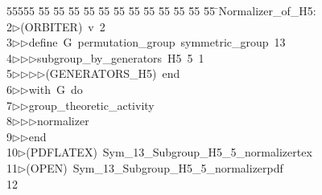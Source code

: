 %
%
\begin{tabbing}
55555 \= 55 \= 55 \= 55 \= 55 \= 55 \= 55 \= 55 \= 55 \= 55 \= 55 \= 55 \= 55 \= \>Normalizer\_of\_H5:\\[0pt]
2\>$\triangleright$\>(ORBITER)\ v\ 2\ \\[0pt]
3\>$\triangleright$\>$\triangleright$\>define\ G\ permutation\_group\ symmetric\_group\ 13\ \\[0pt]
4\>$\triangleright$\>$\triangleright$\>$\triangleright$\>subgroup\_by\_generators\ H5\ 5\ 1\ \\[0pt]
5\>$\triangleright$\>$\triangleright$\>$\triangleright$\>$\triangleright$\>(GENERATORS\_H5)\ end\ \\[0pt]
6\>$\triangleright$\>$\triangleright$\>with\ G\ do\ \\[0pt]
7\>$\triangleright$\>$\triangleright$\>group\_theoretic\_activity\ \\[0pt]
8\>$\triangleright$\>$\triangleright$\>$\triangleright$\>normalizer\ \\[0pt]
9\>$\triangleright$\>$\triangleright$\>end\\[0pt]
10\>$\triangleright$\>(PDFLATEX)\ Sym\_13\_Subgroup\_H5\_5\_normalizertex\\[0pt]
11\>$\triangleright$\>(OPEN)\ Sym\_13\_Subgroup\_H5\_5\_normalizerpdf\\[0pt]
12\>\end{tabbing}
